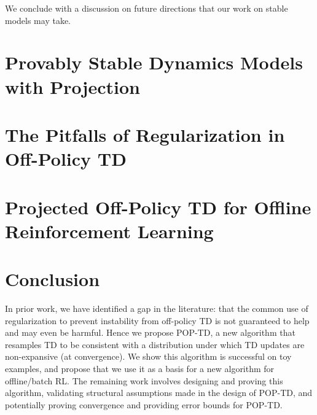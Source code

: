 \documentclass[11pt]{book}
\begin{document}
We conclude with a discussion on future directions that our work on stable models may take.


\mainmatter
\chapter{Provably Stable Dynamics Models with Projection}




\chapter{The Pitfalls of Regularization in Off-Policy TD}



\chapter{Projected Off-Policy TD for Offline Reinforcement Learning}




\chapter{Conclusion}

In prior work, we have identified a gap in the literature: that the common use of regularization to prevent instability from off-policy TD is not guaranteed to help and may even be harmful. Hence we propose POP-TD, a new algorithm that resamples TD to be consistent with a distribution under which TD updates are non-expansive (at convergence). We show this algorithm is successful on toy examples, and propose that we use it as a basis for a new algorithm for offline/batch RL.  The remaining work involves designing and proving this algorithm, validating structural assumptions made in the design of POP-TD, and potentially proving convergence and providing error bounds for POP-TD.

\appendix


\backmatter{}
\printbibliography{}
\end{document}

